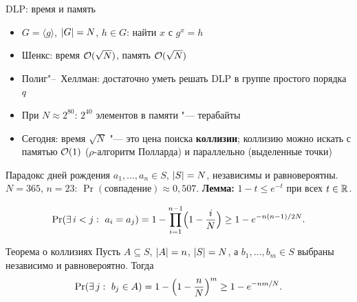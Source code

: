 \documentclass{ca-slides}
\author{}
\begin{document}
\titleframe

\begin{canvasframe}{DLP: время и память}
  \begin{itemize}
    \item $G = \langle g \rangle$, $\lvert G\rvert = N$, $h \in G$: найти $x$ с $g^x = h$
    \item Шенкс: время $\mathcal{O}(\sqrt N)$, \alert{память} $\mathcal{O}(\sqrt N)$
    \item Полиг"--~Хеллман: достаточно уметь решать DLP в группе простого порядка $q$
    \item При $N \approx 2^{80}$: $2^{40}$ элементов в памяти "--- терабайты
    \item Сегодня: время $\sqrt N$ "--- это цена поиска \textbf{коллизии};
      коллизию можно искать с памятью $\mathcal{O}(1)$ ($\rho$-алгоритм Полларда)
      и параллельно (выделенные точки)
  \end{itemize}
\end{canvasframe}

\begin{canvasframe}{Парадокс дней рождения}
  $a_1, \dots, a_n \in S$, $\lvert S\rvert = N$, независимы и равновероятны.
  $N = 365$, $n = 23$: $\Pr(\text{совпадение}) \approx 0{,}507$.
  \textbf{Лемма:} $1 - t \le e^{-t}$ при всех $t \in \mathbb{R}$.
  \begin{theorem}
    \[\Pr(\exists\, i < j:\ a_i = a_j) = 1 - \prod_{i=1}^{n-1}\Bigl(1 - \frac iN\Bigr)
      \ge 1 - e^{-n(n-1)/2N}.\]
  \end{theorem}
  \proofarea[0.1\textheight]
\end{canvasframe}

\begin{theoremframe}{Теорема о коллизиях}
  Пусть $A \subseteq S$, $\lvert A\rvert = n$, $\lvert S\rvert = N$, а $b_1, \dots, b_m \in S$ выбраны
  независимо и равновероятно. Тогда
  \[\Pr(\exists\, j:\ b_j \in A) = 1 - \Bigl(1 - \frac nN\Bigr)^m \ge 1 - e^{-nm/N}.\]
\end{theoremframe}
\end{document}
